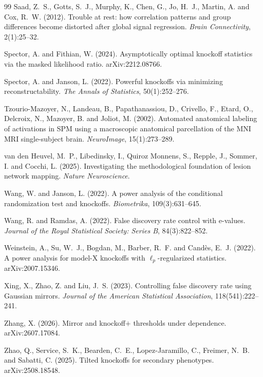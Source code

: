 \documentclass[11pt,a4paper]{article}
\begin{document}
\begin{thebibliography}{99}
Saad, Z.~S., Gotts, S.~J., Murphy, K., Chen, G., Jo, H.~J., Martin, A. and
Cox, R.~W. (2012).
Trouble at rest: how correlation patterns and group differences become
distorted after global signal regression.
\emph{Brain Connectivity}, 2(1):25--32.

Spector, A. and Fithian, W. (2024).
Asymptotically optimal knockoff statistics via the masked likelihood ratio.
arXiv:2212.08766.

Spector, A. and Janson, L. (2022).
Powerful knockoffs via minimizing reconstructability.
\emph{The Annals of Statistics}, 50(1):252--276.

Tzourio-Mazoyer, N., Landeau, B., Papathanassiou, D., Crivello, F., Etard,
O., Delcroix, N., Mazoyer, B. and Joliot, M. (2002).
Automated anatomical labeling of activations in SPM using a macroscopic
anatomical parcellation of the MNI MRI single-subject brain.
\emph{NeuroImage}, 15(1):273--289.

van den Heuvel, M.~P., Libedinsky, I., Quiroz Monnens, S., Repple, J.,
Sommer, I. and Cocchi, L. (2025).
Investigating the methodological foundation of lesion network mapping.
\emph{Nature Neuroscience}.

Wang, W. and Janson, L. (2022).
A power analysis of the conditional randomization test and knockoffs.
\emph{Biometrika}, 109(3):631--645.

Wang, R. and Ramdas, A. (2022).
False discovery rate control with e-values.
\emph{Journal of the Royal Statistical Society: Series B}, 84(3):822--852.

Weinstein, A., Su, W.~J., Bogdan, M., Barber, R.~F. and Cand\`es, E.~J.
(2022).
A power analysis for model-X knockoffs with $\ell_p$-regularized
statistics.
arXiv:2007.15346.

Xing, X., Zhao, Z. and Liu, J.~S. (2023).
Controlling false discovery rate using Gaussian mirrors.
\emph{Journal of the American Statistical Association}, 118(541):222--241.

Zhang, X. (2026).
Mirror and knockoff$+$ thresholds under dependence.
arXiv:2607.17084.

Zhao, Q., Service, S.~K., Bearden, C.~E., Lopez-Jaramillo, C., Freimer,
N.~B. and Sabatti, C. (2025).
Tilted knockoffs for secondary phenotypes.
arXiv:2508.18548.

\end{thebibliography}
\end{document}
